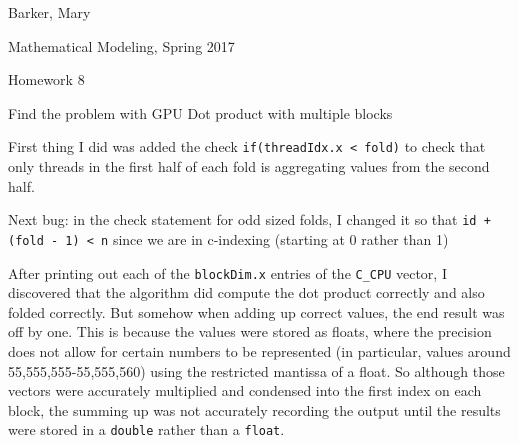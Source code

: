 \documentclass[11pt]{article}
\def \hwnum{8}
\def \hwdescription{Find the problem with GPU Dot product with multiple blocks}
\def \hwscript{hw08.cu}
\begin{document}
{\color{white}{thing}}
\begin{center}
{
	\fontsize{20pt}{20pt}\selectfont
	Barker, Mary
}

\vspace{1cm}

{
	\fontsize{20pt}{20pt}\selectfont
	Mathematical Modeling, Spring 2017
}

\vspace{1cm}

{
	\fontsize{20pt}{20pt}\selectfont
	Homework \hwnum
}

\vspace{1cm}

{
	\fontsize{20pt}{20pt}\selectfont
	\hwdescription
}

\end{center}
\pagebreak
\doublespace
First thing I did was added the check \verb|if(threadIdx.x < fold)| to check that only 
threads in the first half of each fold is aggregating values from the second half. 

Next bug: in the check statement for odd sized folds, I changed it so that 
\verb|id + (fold - 1) < n| since we are in c-indexing (starting at 0 rather than 1)

After printing out each of the \verb|blockDim.x| entries of the \verb|C_CPU| vector, 
I discovered that the algorithm did compute the dot product correctly and also folded correctly. 
But somehow when adding up correct values, the end result was off by one. This is because 
the values were stored as floats, where the precision does not allow for certain numbers to 
be represented (in particular, values around 55,555,555-55,555,560) using the 
restricted mantissa of a float. 
So although those vectors were accurately multiplied and condensed into the first 
index on each block, the 
summing up was not accurately recording the output until the results were stored in a 
\verb|double| rather than a \verb|float|. 

\pagebreak

\end{document}
